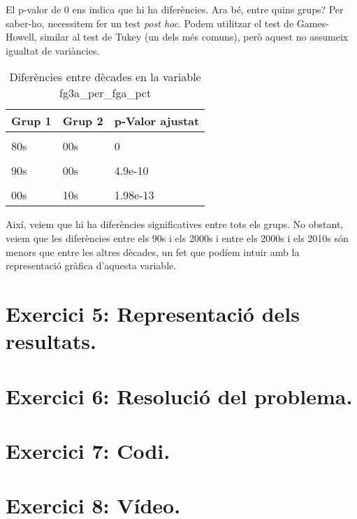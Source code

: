 \documentclass[
]{article}
\begin{document}
El p-valor de 0 ens indica que hi ha diferències. Ara bé, entre quins
grups? Per saber-ho, necessitem fer un test \emph{post hoc}. Podem
utilitzar el test de Games-Howell, similar al test de Tukey (un dels més
comuns), però aquest no assumeix igualtat de variàncies.

\begin{table}[!h]

\caption{\label{tab:unnamed-chunk-21}Diferències entre dècades en la variable fg3a_per_fga_pct}
\centering
\begin{tabular}[t]{lll}
\toprule
Grup 1 & Grup 2 & p-Valor ajustat\\
\midrule
\cellcolor{gray!6}{80s} & \cellcolor{gray!6}{90s} & \cellcolor{gray!6}{0}\\
80s & 00s & 0\\
\cellcolor{gray!6}{80s} & \cellcolor{gray!6}{10s} & \cellcolor{gray!6}{0}\\
90s & 00s & 4.9e-10\\
\cellcolor{gray!6}{90s} & \cellcolor{gray!6}{10s} & \cellcolor{gray!6}{0}\\
\addlinespace
00s & 10s & 1.98e-13\\
\bottomrule
\end{tabular}
\end{table}

Així, veiem que hi ha diferències significatives entre tots els grups.
No obstant, veiem que les diferències entre els 90s i els 2000s i entre
els 2000s i els 2010s són menors que entre les altres dècades, un fet
que podíem intuir amb la representació gràfica d'aquesta variable.

\hypertarget{exercici-5-representaciuxf3-dels-resultats.}{%
\section{Exercici 5: Representació dels
resultats.}\label{exercici-5-representaciuxf3-dels-resultats.}}

\hypertarget{exercici-6-resoluciuxf3-del-problema.}{%
\section{Exercici 6: Resolució del
problema.}\label{exercici-6-resoluciuxf3-del-problema.}}

\hypertarget{exercici-7-codi.}{%
\section{Exercici 7: Codi.}\label{exercici-7-codi.}}

\hypertarget{exercici-8-vuxeddeo.}{%
\section{Exercici 8: Vídeo.}\label{exercici-8-vuxeddeo.}}
\end{document}
